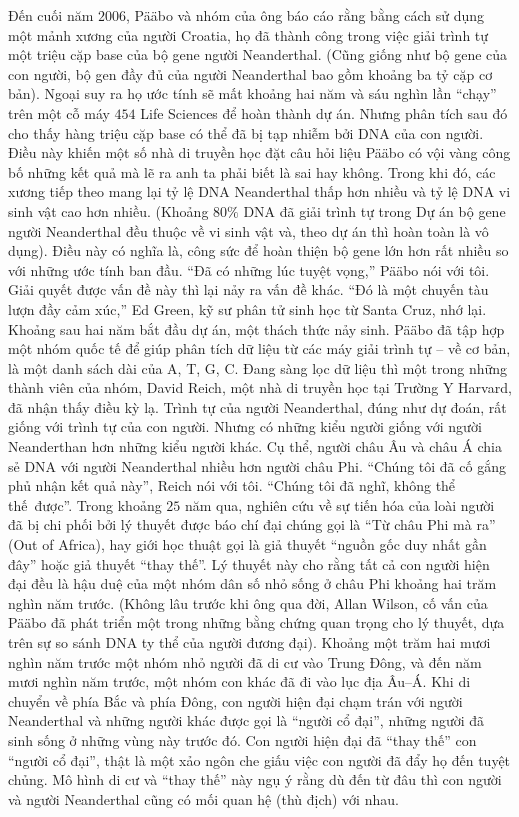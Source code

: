 \begin{multicols}{2}
	\vskip 0.1cm
	Đến cuối năm $2006$, Pääbo và nhóm của ông báo cáo rằng bằng cách sử dụng một mảnh xương của người Croatia, họ đã thành công trong việc giải trình tự một triệu cặp base của bộ gene người Neanderthal. (Cũng giống như bộ gene của con người, bộ gen đầy đủ của người Neanderthal bao gồm khoảng ba tỷ cặp cơ bản). Ngoại suy ra họ ước tính sẽ mất khoảng hai năm và sáu nghìn lần “chạy” trên một cỗ máy $454$ Life Sciences để hoàn thành dự án. Nhưng phân tích sau đó cho thấy hàng triệu cặp base có thể đã bị tạp nhiễm bởi DNA của con người. Điều này khiến một số nhà di truyền học đặt câu hỏi liệu Pääbo có vội vàng công bố những kết quả mà lẽ ra anh ta phải biết là sai hay không. Trong khi đó, các xương tiếp theo mang lại tỷ lệ DNA Neanderthal thấp hơn nhiều và tỷ lệ DNA vi sinh vật cao hơn nhiều. (Khoảng $80\%$ DNA đã giải trình tự trong Dự án bộ gene người Neanderthal đều thuộc về vi sinh vật và, theo dự án thì hoàn toàn là vô dụng). Điều này có nghĩa là, công sức để hoàn thiện bộ gene lớn hơn rất nhiều so với những ước tính ban đầu. “Đã có những lúc tuyệt vọng,” Pääbo nói với tôi. Giải quyết được vấn đề này thì lại nảy ra vấn đề khác. “Đó là một chuyến tàu lượn đầy cảm xúc,” Ed Green, kỹ sư phân tử sinh học từ Santa Cruz, nhớ lại.
	\vskip 0.1cm
	Khoảng sau hai năm bắt đầu dự án, một thách thức nảy sinh. Pääbo đã tập hợp một nhóm quốc tế để giúp phân tích dữ liệu từ các máy giải trình tự -- về cơ bản, là một danh sách dài của A, T, G, C. Đang sàng lọc dữ liệu thì một trong những thành viên của nhóm, David Reich, một nhà di truyền học tại Trường Y Harvard, đã nhận thấy điều kỳ lạ. Trình tự của người Neanderthal, đúng như dự đoán, rất giống với trình tự của con người. Nhưng có những kiểu người giống với người Neanderthan hơn những kiểu người khác. Cụ thể, người châu Âu và châu Á chia sẻ DNA với người Neanderthal nhiều hơn người châu Phi. “Chúng tôi đã cố gắng phủ nhận kết quả này”, Reich nói với tôi. “Chúng tôi đã nghĩ, không thể thế~được”.
	\vskip 0.1cm
	Trong khoảng $25$ năm qua, nghiên cứu về sự tiến hóa của loài người đã bị chi phối bởi lý thuyết được báo chí đại chúng gọi là “Từ châu Phi mà ra” (Out of Africa), hay giới học thuật gọi là giả thuyết “nguồn gốc duy nhất gần đây” hoặc giả thuyết “thay thế”. Lý thuyết này cho rằng tất cả con người hiện đại đều là hậu duệ của một nhóm dân số nhỏ sống ở châu Phi khoảng hai trăm nghìn năm trước. (Không lâu trước khi ông qua đời, Allan Wilson, cố vấn của Pääbo đã phát triển một trong những bằng chứng quan trọng cho lý thuyết, dựa trên sự so sánh DNA ty thể của người đương đại). Khoảng một trăm hai mươi nghìn năm trước một nhóm nhỏ người đã di cư vào Trung Đông, và đến năm mươi nghìn năm trước, một nhóm con khác đã đi vào lục địa Âu--Á. Khi di chuyển về phía Bắc và phía Đông, con người hiện đại chạm trán với người Neanderthal và những người khác được gọi là “người cổ đại”, những người đã sinh sống ở những vùng này trước đó. Con người hiện đại đã “thay thế” con “người cổ đại”, thật là một xảo ngôn che giấu việc con người đã đẩy họ đến tuyệt chủng. Mô hình di cư và “thay thế” này ngụ ý rằng dù đến từ đâu thì con người và người Neanderthal cũng có mối quan hệ (thù địch) với nhau.

\end{multicols}
